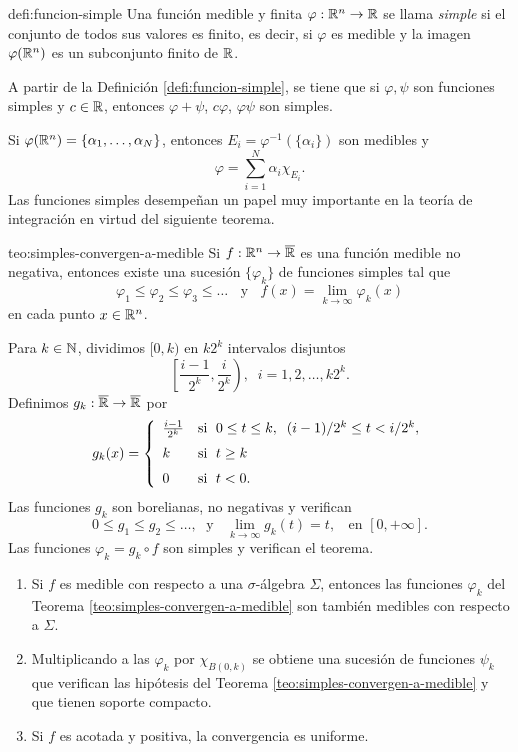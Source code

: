 \begin{definicion}{defi:funcion-simple}
Una funci\'on medible y finita  $\varphi:\mathbb{R}^n \to \mathbb{R}$ 
se llama \emph{simple} si el conjunto de todos sus valores es finito, es decir, si $\varphi$ es medible y la imagen  $\varphi(\mathbb{R}^n)$ es un subconjunto finito de $\mathbb{R}$.
\end{definicion}

A partir de la Definici\'on \ref{defi:funcion-simple}, se tiene que si $\varphi,\psi$ son funciones simples y $c \in \mathbb{R}$, entonces $\varphi + \psi$, $c\varphi$,  $\varphi \psi$ son simples.

Si $\varphi(\mathbb{R}^n)=\{\alpha_1,\ldots,\alpha_N\}$, entonces $E_i=\varphi^{-1}(\{\alpha_i\})$ son medibles y 
\[
\varphi=\sum\limits_{i=1}^N \alpha_i \chi_{E_i}.
\]
Las funciones simples desempe\~nan un papel muy importante en la teor\'ia de integraci\'on en virtud del siguiente teorema.

\begin{teorema}{teo:simples-convergen-a-medible}
Si $f:\mathbb{R}^n \to \overline{\mathbb{R}}$ es una funci\'on medible no negativa, entonces existe una sucesi\'on $\{\varphi_k\}$ de funciones simples tal que
\[
\varphi_1\leq \varphi_2 \leq \varphi_3\leq \ldots \;\;\mbox{ y }\;\;
f(x)=\lim\limits_{k \to \infty} \varphi_k(x)
\]
en cada punto $x \in \mathbb{R}^n$.
\end{teorema}

\begin{demo}
Para $k \in \mathbb{N}$, dividimos $[0,k)$ en $k2^k$ intervalos disjuntos
\[
\left[\frac{i-1}{2^k},\frac{i}{2^k}\right), \;\;i=1,2,\ldots,k2^k.
\]
Definimos $g_k:\overline{\mathbb{R}} \to \overline{\mathbb{R}}$ por
\[
g_k(x)=
\left\{
\begin{array}{ll}
    \frac{i-1}{2^k} & \mbox{si }\; 0\leq t\leq k, \;\; (i-1)/2^k\leq t< i/2^k, 
    \medskip
    \\
    k     & \mbox{si }\;t\geq k
    \medskip
    \\
    0     & \mbox{si }\; t<0.
\end{array}
\right.
\]
Las funciones $g_k$ son borelianas, no negativas y verifican
\[
0\leq g_1\leq g_2\leq \ldots,\;\mbox{ y }\;\;
\lim\limits_{k \to \infty} g_k(t)=t, \;\;\mbox{ en } [0, +\infty].
\]
Las funciones $\varphi_k = g_k \circ f$ son simples y verifican  el teorema.
\end{demo}

\begin{observacion}{}
\begin{enumerate}
    \item Si $f$ es medible con respecto a una $\sigma$-\'algebra $\Sigma$, entonces las funciones $\varphi_k$ del Teorema \ref{teo:simples-convergen-a-medible} son tambi\'en medibles con respecto a $\Sigma$.
    \item Multiplicando a las $\varphi_k$ por $\chi_{B(0,k)}$ se obtiene una sucesi\'on de  funciones $\psi_k$ que verifican las hip\'otesis del Teorema \ref{teo:simples-convergen-a-medible} y que tienen soporte compacto.
    \item Si $f$ es acotada y positiva,  la convergencia es uniforme.
\end{enumerate}
\end{observacion}

